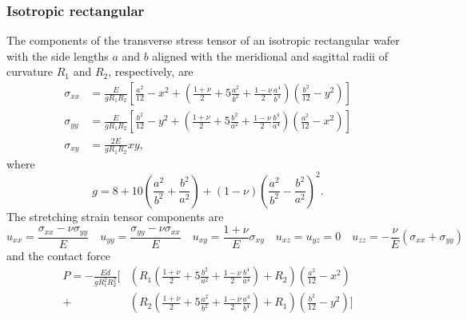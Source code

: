 \documentclass[11pt,a4paper]{article}
\begin{document}
\subsubsection{Isotropic rectangular}
The components of the transverse stress tensor of an isotropic rectangular wafer with the side lengths $a$ and $b$ aligned with the meridional and sagittal radii of curvature $R_1$ and $R_2$, respectively, are
\begin{align}
\sigma_{xx} &= \frac{E}{g R_1 R_2}\left[\frac{a^2}{12}- x^2 +\left(\frac{1+\nu}{2}+5\frac{ a^2}{b^2} +\frac{1-\nu}{2} \frac{a^4}{b^4}\right)\left(\frac{b^2}{12}-y^2 \right)\right]  \\
\sigma_{yy} &= \frac{E}{g R_1 R_2}\left[\frac{b^2}{12}- y^2 +\left(\frac{1+\nu}{2} +5\frac{ b^2}{a^2} +\frac{1-\nu}{2} \frac{b^4}{a^4}\right)\left(\frac{a^2}{12}-x^2 \right)\right]  \\
\sigma_{xy} &= \frac{2 E}{g R_1 R_2}xy, 
\end{align}
where
\begin{equation}
g = 8+10 \left(\frac{a^2}{b^2} + \frac{b^2}{a^2}\right) + (1-\nu)\left(\frac{a^2}{b^2} - \frac{b^2}{a^2}\right)^2.
\end{equation}
The stretching strain tensor components are
\begin{equation}
u_{xx} = \frac{\sigma_{xx}-\nu \sigma_{yy}}{E} \quad u_{yy} = \frac{\sigma_{yy}-\nu \sigma_{xx}}{E} \quad u_{xy} = \frac{1+\nu}{E}\sigma_{xy} \quad u_{xz}=u_{yz}=0 \quad  u_{zz} = -\frac{\nu}{E}(\sigma_{xx}+\sigma_{yy})
\end{equation}
and the contact force
\begin{align}
P = - \frac{Ed}{gR_1^2R_2^2}\Bigg[
&\left( R_1 \left(\frac{1+\nu}{2} +5\frac{ b^2}{a^2} +\frac{1-\nu}{2} \frac{b^4}{a^4}\right) + R_2\right)\left(\frac{a^2}{12}-x^2 \right) \nonumber \\ +
&\left( R_2 \left(\frac{1+\nu}{2}+5\frac{ a^2}{b^2} +\frac{1-\nu}{2} \frac{a^4}{b^4}\right)
+ R_1 \right)\left(\frac{b^2}{12}-y^2 \right) \Bigg]
\end{align}
\end{document}
